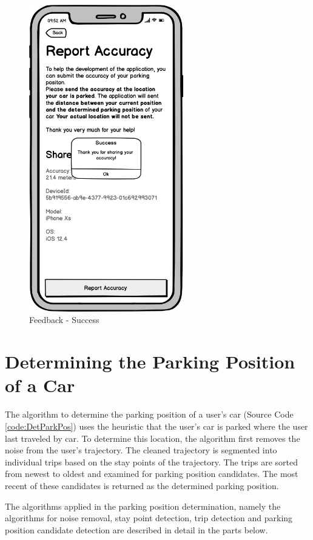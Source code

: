 \begin{figure}[h]
\begin{minipage}[b]{0.49\textwidth}
    \includegraphics[width=0.6\textwidth]{images/UI/Iteration4-Feedback-Success.png}
    \caption{Feedback - Success}
    \label{fig:feedback-succ}
  \end{minipage}
\end{figure}

\section{Determining the Parking Position of a Car}
The algorithm to determine the parking position of a user's car (Source Code \ref{code:DetParkPos}) uses the heuristic that the user's car is parked where the user last traveled by car. To determine this location, the algorithm first removes the noise from the user's trajectory. The cleaned trajectory is segmented into individual trips based on the stay points of the trajectory. The trips are sorted from newest to oldest and examined for parking position candidates. The most recent of these candidates is returned as the determined parking position.

The algorithms applied in the parking position determination, namely the algorithms for noise removal, stay point detection, trip detection and parking position candidate detection are described in detail in the parts below.


